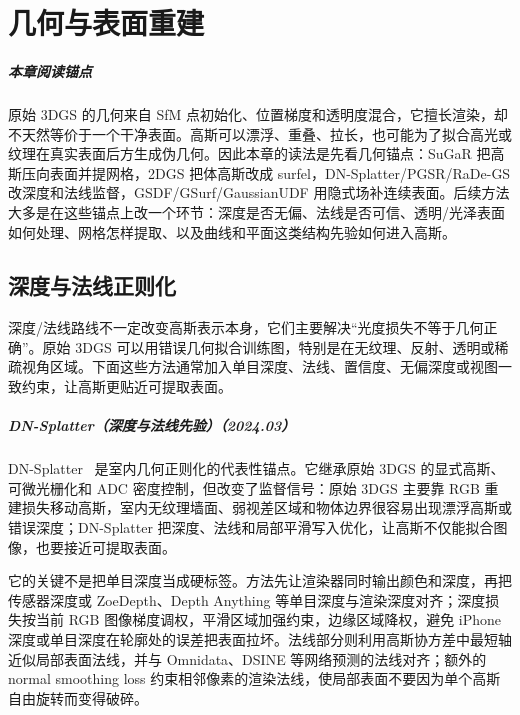 \chapter{几何与表面重建}

\paragraph*{本章阅读锚点}
原始 3DGS 的几何来自 SfM 点初始化、位置梯度和透明度混合，它擅长渲染，却不天然等价于一个干净表面。高斯可以漂浮、重叠、拉长，也可能为了拟合高光或纹理在真实表面后方生成伪几何。因此本章的读法是先看几何锚点：SuGaR 把高斯压向表面并提网格，2DGS 把体高斯改成 surfel，DN-Splatter/PGSR/RaDe-GS 改深度和法线监督，GSDF/GSurf/GaussianUDF 用隐式场补连续表面。后续方法大多是在这些锚点上改一个环节：深度是否无偏、法线是否可信、透明/光泽表面如何处理、网格怎样提取、以及曲线和平面这类结构先验如何进入高斯。

\section{深度与法线正则化}

深度/法线路线不一定改变高斯表示本身，它们主要解决“光度损失不等于几何正确”。原始 3DGS 可以用错误几何拟合训练图，特别是在无纹理、反射、透明或稀疏视角区域。下面这些方法通常加入单目深度、法线、置信度、无偏深度或视图一致约束，让高斯更贴近可提取表面。



\paragraph{DN-Splatter（深度与法线先验）（2024.03）}
DN-Splatter~\cite{2403_17822} 是室内几何正则化的代表性锚点。它继承原始 3DGS 的显式高斯、可微光栅化和 ADC 密度控制，但改变了监督信号：原始 3DGS 主要靠 RGB 重建损失移动高斯，室内无纹理墙面、弱视差区域和物体边界很容易出现漂浮高斯或错误深度；DN-Splatter 把深度、法线和局部平滑写入优化，让高斯不仅能拟合图像，也要接近可提取表面。

它的关键不是把单目深度当成硬标签。方法先让渲染器同时输出颜色和深度，再把传感器深度或 ZoeDepth、Depth Anything 等单目深度与渲染深度对齐；深度损失按当前 RGB 图像梯度调权，平滑区域加强约束，边缘区域降权，避免 iPhone 深度或单目深度在轮廓处的误差把表面拉坏。法线部分则利用高斯协方差中最短轴近似局部表面法线，并与 Omnidata、DSINE 等网络预测的法线对齐；额外的 normal smoothing loss 约束相邻像素的渲染法线，使局部表面不要因为单个高斯自由旋转而变得破碎。

